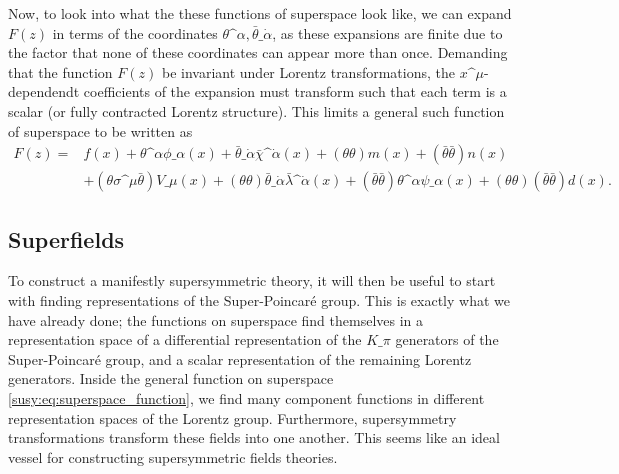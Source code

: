         Now, to look into what the these functions of superspace look like, we can expand \(F(z)\) in terms of the coordinates \(\theta\^\alpha, \bar\theta\_{\dot\alpha}\), as these expansions are finite due to the factor that none of these coordinates can appear more than once.
        Demanding that the function \(F(z)\) be invariant under Lorentz transformations, the \(x\^\mu\)-dependendt coefficients of the expansion must transform such that each term is a scalar (or fully contracted Lorentz structure).
        This limits a general such function of superspace to be written as
        \begin{align}
            \label{susy:eq:superspace_function}
            \nonumber
            F(z) = & f(x) + \theta\^\alpha \phi\_\alpha(x) + \bar\theta\_{\dot\alpha} \bar\chi\^{\dot\alpha}(x) + (\theta\theta) m(x) + (\bar\theta\bar\theta) n(x)                                                                          \\
                   & + (\theta \sigma\^\mu \bar\theta) V\_\mu(x) + (\theta\theta) \bar\theta\_{\dot\alpha} \bar\lambda\^{\dot\alpha}(x) + (\bar\theta\bar\theta) \theta\^\alpha \psi\_\alpha(x) + (\theta\theta)(\bar\theta\bar\theta) d(x).
        \end{align}


    \subsection{Superfields}
        To construct a manifestly supersymmetric theory, it will then be useful to start with finding representations of the Super-Poincaré group.
        This is exactly what we have already done; the functions on superspace find themselves in a representation space of a differential representation of the \(K\_\pi\) generators of the Super-Poincaré group, and a scalar representation of the remaining Lorentz generators.
        Inside the general function on superspace \cref{susy:eq:superspace_function}, we find many component functions in different representation spaces of the Lorentz group.
        Furthermore, supersymmetry transformations transform these fields into one another.
        This seems like an ideal vessel for constructing supersymmetric fields theories.

